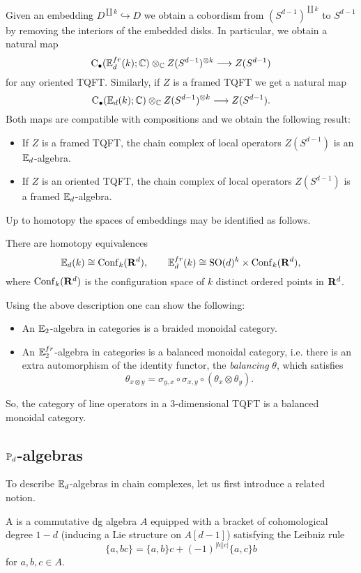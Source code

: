 Given an embedding $D^{\coprod k}\hookrightarrow D$ we obtain a cobordism from $(S^{d-1})^{\coprod k}$ to $S^{d-1}$ by removing the interiors of the embedded disks. In particular, we obtain a natural map
\[\mathrm{C}_\bullet(\mathbb{E}^{fr}_d(k); \mathbb{C})\otimes_{\mathbb{C}} Z(S^{d-1})^{\otimes k}\longrightarrow Z(S^{d-1})\]
for any oriented TQFT. Similarly, if $Z$ is a framed TQFT we get a natural map
\[\mathrm{C}_\bullet(\mathbb{E}_d(k); \mathbb{C})\otimes_{\mathbb{C}} Z(S^{d-1})^{\otimes k}\longrightarrow Z(S^{d-1}).\]
Both maps are compatible with compositions and we obtain the following result:
\begin{itemize}
\item If $Z$ is a framed TQFT, the chain complex of local operators $Z(S^{d-1})$ is an $\mathbb{E}_d$-algebra.
\item If $Z$ is an oriented TQFT, the chain complex of local operators $Z(S^{d-1})$ is a framed $\mathbb{E}_d$-algebra.
\end{itemize}

Up to homotopy the spaces of embeddings may be identified as follows.

\begin{prop}
There are homotopy equivalences
\[\mathbb{E}_d(k)\cong \mathrm{Conf}_k(\mathbf{R}^d),\qquad \mathbb{E}^{fr}_d(k)\cong \mathrm{SO}(d)^k\times \mathrm{Conf}_k(\mathbf{R}^d),\]
where $\mathrm{Conf}_k(\mathbf{R}^d)$ is the configuration space of $k$ distinct ordered points in $\mathbf{R}^d$.
\end{prop}

Using the above description one can show the following:
\begin{itemize}
\item An $\mathbb{E}_2$-algebra in categories is a braided monoidal category.
\item An $\mathbb{E}^{fr}_2$-algebra in categories is a balanced monoidal category, i.e. there is an extra automorphism of the identity functor, the \emph{balancing} $\theta$, which satisfies
\[\theta_{x\otimes y} = \sigma_{y, x}\circ \sigma_{x, y}\circ (\theta_x\otimes \theta_y).\]
\end{itemize}

So, the category of line operators in a 3-dimensional TQFT is a balanced monoidal category.

\subsection{$\mathbb{P}_d$-algebras}

To describe $\mathbb{E}_d$-algebras in chain complexes, let us first introduce a related notion.

\begin{defn}
A  is a commutative dg algebra $A$ equipped with a bracket of cohomological degree $1-d$ (inducing a Lie structure on $A[d-1]$) satisfying the Leibniz rule
\[\{a, bc\} = \{a, b\}c + (-1)^{|b||c|}\{a, c\}b\]
for $a,b,c\in A$.
\end{defn}

